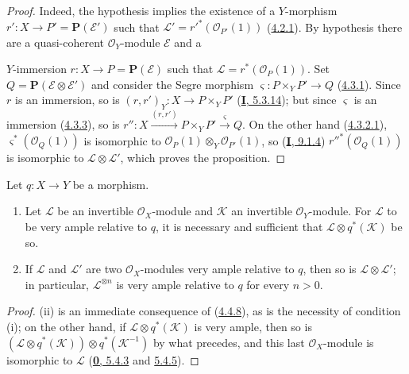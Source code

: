 \begin{proof}
Indeed, the hypothesis implies the existence of a $Y$-morphism
$r':X\to P'=\mathbf{P}(\mathcal{E}')$ such that
$\mathcal{L}'=r'^*(\mathcal{O}_{P'}(1))$
(\hyperref[II.4.2.1]{4.2.1}). By hypothesis there are a quasi-coherent
$\mathcal{O}_Y$-module $\mathcal{E}$ and a


$Y$-immersion $r:X\to P=\mathbf{P}(\mathcal{E})$ such that
$\mathcal{L}=r^*(\mathcal{O}_P(1))$. Set
$Q=\mathbf{P}(\mathcal{E}\otimes\mathcal{E}')$ and consider the Segre
morphism $\varsigma:P\times_YP'\to Q$ (\hyperref[II.4.3.1]{4.3.1}). Since
$r$ is an immersion, so is
$(r,r')_Y:X\to P\times_YP'$ (\hyperref[I.5.3.14]{\textbf{I}, 5.3.14}); but since
$\varsigma$ is an immersion (\hyperref[II.4.3.3]{4.3.3}), so is
$r'':X\xrightarrow{(r,r')}P\times_YP'\xrightarrow{\varsigma}Q$. On the other
hand (\hyperref[II.4.3.2.1]{4.3.2.1}),
$\varsigma^*(\mathcal{O}_Q(1))$ is isomorphic to
$\mathcal{O}_P(1)\otimes_Y\mathcal{O}_{P'}(1)$, so
(\hyperref[I.9.1.4]{\textbf{I}, 9.1.4}) $r''^*(\mathcal{O}_Q(1))$ is isomorphic to
$\mathcal{L}\otimes\mathcal{L}'$, which proves the proposition.
\end{proof}

\begin{corollary}[4.4.9]
\label{II.4.4.9}
Let $q:X\to Y$ be a morphism.
\begin{enumerate}
  \item[\rm{(i)}] Let $\mathcal{L}$ be an invertible $\mathcal{O}_X$-module
  and $\mathcal{K}$ an invertible $\mathcal{O}_Y$-module. For $\mathcal{L}$
  to be very ample relative to $q$, it is necessary and sufficient that
  $\mathcal{L}\otimes q^*(\mathcal{K})$ be so.
  \item[\rm{(ii)}] If $\mathcal{L}$ and $\mathcal{L}'$ are two
  $\mathcal{O}_X$-modules very ample relative to $q$, then so is
  $\mathcal{L}\otimes\mathcal{L}'$; in particular,
  $\mathcal{L}^{\otimes n}$ is very ample relative to $q$ for every
  $n>0$.
\end{enumerate}
\end{corollary}

\begin{proof}
(ii) is an immediate consequence of (\hyperref[II.4.4.8]{4.4.8}), as is
the necessity of condition (i); on the other hand, if
$\mathcal{L}\otimes q^*(\mathcal{K})$ is very ample, then so is
$(\mathcal{L}\otimes q^*(\mathcal{K}))\otimes q^*(\mathcal{K}^{-1})$
by what precedes, and this last $\mathcal{O}_X$-module is isomorphic to
$\mathcal{L}$ (\hyperref[0.5.4.3]{\textbf{0}, 5.4.3} and
\hyperref[0.5.4.5]{5.4.5}).
\end{proof}

